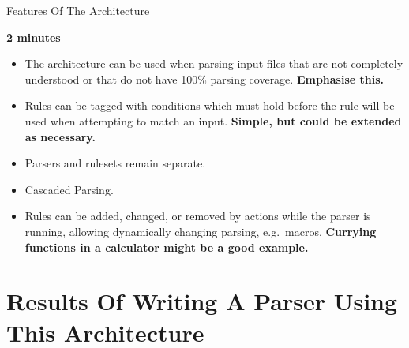 \documentclass{beamer}
\newcommand{\timingnote}[1]{%
    \textbf{#1}%
}
\begin{document}
\begin{frame}{Features Of The Architecture}

    \timingnote{2 minutes}

    \begin{itemize}

        \item The architecture can be used when parsing input files that
            are not completely understood or that do not have 100\% parsing
            coverage.  \timingnote{Emphasise this.}

        \item Rules can be tagged with conditions which must hold before
            the rule will be used when attempting to match an input.
            \timingnote{Simple, but could be extended as necessary.}

        \item Parsers and rulesets remain separate.

        \item Cascaded Parsing.

        \item Rules can be added, changed, or removed by actions while the
            parser is running, allowing dynamically changing parsing, e.g.\
            macros.  \timingnote{Currying functions in a calculator might
            be a good example.}

    \end{itemize}

\end{frame}


\section{Results Of Writing A Parser Using This Architecture}
\end{document}
